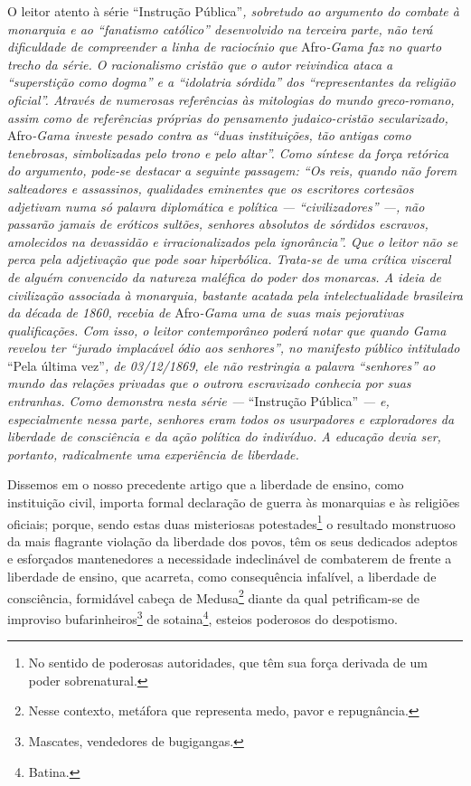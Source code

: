 \begin{didascalia}
O leitor atento à série ``Instrução Pública''\emph{, sobretudo ao
argumento do combate à monarquia e ao ``fanatismo católico'' desenvolvido
na terceira parte, não terá dificuldade de compreender a linha de
raciocínio que} Afro\emph{-Gama faz no quarto trecho da série. O
racionalismo cristão que o autor reivindica ataca a ``superstição como
dogma'' e a ``idolatria sórdida'' dos ``representantes da religião oficial''.
Através de numerosas referências às mitologias do mundo greco-romano,
assim como de referências próprias do pensamento judaico-cristão
secularizado,} Afro\emph{-Gama investe pesado contra as ``duas
instituições, tão antigas como tenebrosas, simbolizadas pelo trono e
pelo altar''. Como síntese da força retórica do argumento, pode-se
destacar a seguinte passagem: ``Os reis, quando não forem salteadores e
assassinos, qualidades eminentes que os escritores cortesãos adjetivam
numa só palavra diplomática e política --- ``civilizadores'' ---, não
passarão jamais de eróticos sultões, senhores absolutos de sórdidos
escravos, amolecidos na devassidão e irracionalizados pela ignorância''.
Que o leitor não se perca pela adjetivação que pode soar hiperbólica.
Trata-se de uma crítica visceral de alguém convencido da natureza
maléfica do poder dos monarcas. A ideia de civilização associada à
monarquia, bastante acatada pela intelectualidade brasileira da década
de 1860, recebia de} Afro\emph{-Gama uma de suas mais pejorativas
qualificações. Com isso, o leitor contemporâneo poderá notar que quando
Gama revelou ter ``jurado implacável ódio aos senhores'', no manifesto
público intitulado} ``Pela última vez''\emph{, de 03/12/1869, ele não
restringia a palavra ``senhores'' ao mundo das relações privadas que o
outrora escravizado conhecia por suas entranhas. Como demonstra nesta
série ---} ``Instrução Pública'' \emph{--- e, especialmente nessa parte,
senhores eram todos os usurpadores e exploradores da liberdade de
consciência e da ação política do indivíduo. A educação devia ser,
portanto, radicalmente uma experiência de liberdade.}
\end{didascalia}



Dissemos em o nosso precedente artigo que a liberdade de ensino, como
instituição civil, importa formal declaração de guerra às monarquias e
às religiões oficiais; porque, sendo estas duas misteriosas
potestades\footnote{No sentido de poderosas autoridades, que têm sua
  força derivada de um poder sobrenatural.} o resultado monstruoso da
mais flagrante violação da liberdade dos povos, têm os seus dedicados
adeptos e esforçados mantenedores a necessidade indeclinável de
combaterem de frente a liberdade de ensino, que acarreta, como
consequência infalível, a liberdade de consciência, formidável cabeça de
Medusa\footnote{Nesse contexto, metáfora que representa medo, pavor e
  repugnância.} diante da qual petrificam-se de improviso
bufarinheiros\footnote{Mascates, vendedores de bugigangas.} de
sotaina\footnote{Batina.}, esteios poderosos do despotismo.

